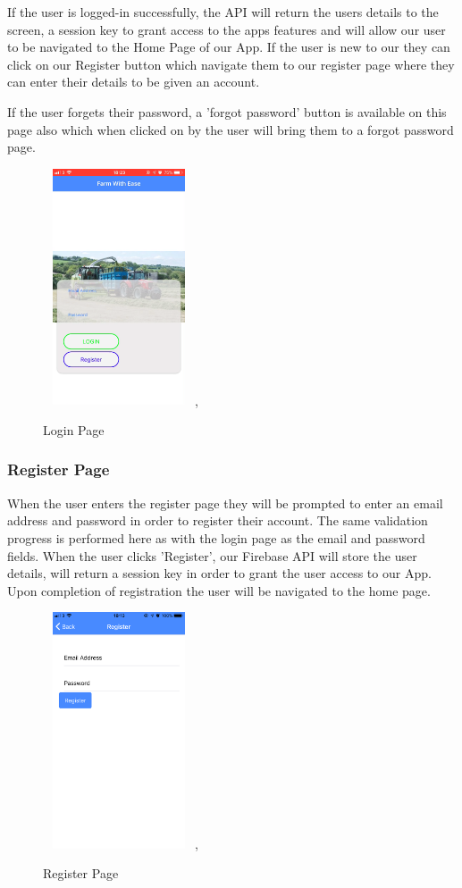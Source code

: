 \documentclass[12pt,a4paper,oneside,openany]{book}
\begin{document}
If the user is logged-in successfully, the API will return the users details to the screen, a session key to grant access to the apps features and will allow our user to be navigated to the Home Page of our App. If the user is new to our they can click on our Register button which navigate them to our register page where they can enter their details to be given an account.

If the user forgets their password, a 'forgot password' button is available on this page also which when clicked on by the user will bring them to a forgot password page. 

\begin{figure}[ht]
\renewcommand\thefigure{5.9}
\centering
\includegraphics[width=4.5cm,height=7cm]{Images/loginPage.jpg},
\caption{Login Page}
\label{login}
\end{figure}

\subsubsection{Register Page}
When the user enters the register page they will be prompted to enter an email address and password in order to register their account. The same validation progress is performed here as with the login page as the email and password fields. When the user clicks 'Register', our Firebase API will store the user details, will return a session key in order to grant the user access to our App. Upon completion of registration the user will be navigated to the home page.

\begin{figure}[ht]
\renewcommand\thefigure{5.10}
\centering
\includegraphics[width=4.5cm,height=7cm]{Images/registerpage.jpg},
\caption{Register Page}
\label{register}
\end{figure}
\end{document}
